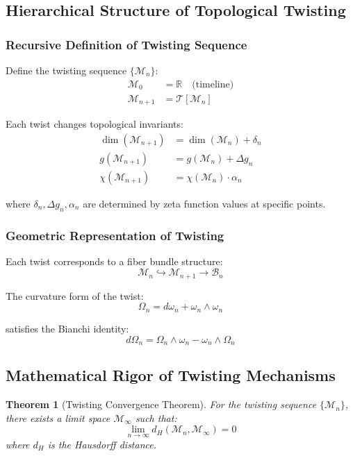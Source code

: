 \documentclass[11pt]{article}
\newtheorem{theorem}{Theorem}[section]
\begin{document}
\subsection{Hierarchical Structure of Topological Twisting}

\subsubsection{Recursive Definition of Twisting Sequence}

Define the twisting sequence $\{\mathcal{M}_n\}$:
\begin{align}
\mathcal{M}_0 &= \mathbb{R} \quad \text{(timeline)} \\
\mathcal{M}_{n+1} &= \mathcal{T}[\mathcal{M}_n]
\end{align}

Each twist changes topological invariants:
\begin{align}
\dim(\mathcal{M}_{n+1}) &= \dim(\mathcal{M}_n) + \delta_n \\
g(\mathcal{M}_{n+1}) &= g(\mathcal{M}_n) + \Delta g_n \\
\chi(\mathcal{M}_{n+1}) &= \chi(\mathcal{M}_n) \cdot \alpha_n
\end{align}

where $\delta_n, \Delta g_n, \alpha_n$ are determined by zeta function values at specific points.

\subsubsection{Geometric Representation of Twisting}

Each twist corresponds to a fiber bundle structure:
$$\mathcal{M}_n \hookrightarrow \mathcal{M}_{n+1} \rightarrow \mathcal{B}_n$$

The curvature form of the twist:
$$\Omega_n = d\omega_n + \omega_n \wedge \omega_n$$

satisfies the Bianchi identity:
$$d\Omega_n = \Omega_n \wedge \omega_n - \omega_n \wedge \Omega_n$$

\subsection{Mathematical Rigor of Twisting Mechanisms}

\begin{theorem}[Twisting Convergence Theorem]
For the twisting sequence $\{\mathcal{M}_n\}$, there exists a limit space $\mathcal{M}_{\infty}$ such that:
$$\lim_{n \to \infty} d_H(\mathcal{M}_n, \mathcal{M}_{\infty}) = 0$$
where $d_H$ is the Hausdorff distance.
\end{theorem}
\end{document}
